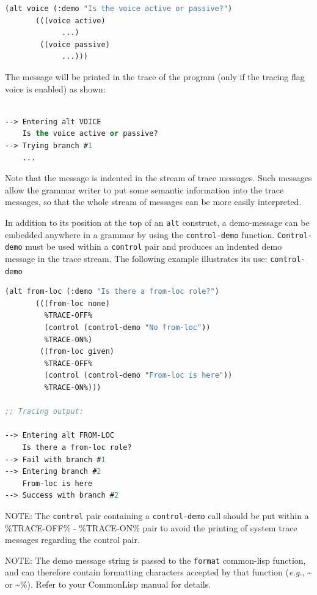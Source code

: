 \documentclass[10pt,a4paper]{report}
\begin{document}
\begin{lstlisting}[language=Lisp]
      (alt voice (:demo "Is the voice active or passive?")
	   (((voice active)
             ...)
	    ((voice passive)
             ...)))
\end{lstlisting}

The message will be printed in the trace of the program (only if the
tracing flag voice is enabled) as shown:

\begin{lstlisting}[language=Lisp]

--> Entering alt VOICE
    Is the voice active or passive?
--> Trying branch #1 
    ...
\end{lstlisting}

Note that the message is indented in the stream of trace messages.  Such
messages allow the grammar writer to put some semantic information into the
trace messages, so that the whole stream of messages can be more easily
interpreted.  

In addition to its position at the top of an {\tt alt} construct, a
demo-message can be embedded anywhere in a grammar by using the
{\tt control-demo} function.  {\tt Control-demo} must be used within a
{\tt control} pair and produces an indented demo message in the trace stream.
The following example illustrates its use:
{\tt control-demo} 

\begin{lstlisting}[language=Lisp]
      (alt from-loc (:demo "Is there a from-loc role?")
	   (((from-loc none)
	     %TRACE-OFF%
	     (control (control-demo "No from-loc"))
	     %TRACE-ON%)
	    ((from-loc given)
	     %TRACE-OFF%
	     (control (control-demo "From-loc is here"))
	     %TRACE-ON%)))

;; Tracing output:

--> Entering alt FROM-LOC
    Is there a from-loc role?
--> Fail with branch #1
--> Entering branch #2
    From-loc is here
--> Success with branch #2

\end{lstlisting}

NOTE: The {\tt control} pair containing a {\tt control-demo} call should be put
within a \%TRACE-OFF\% - \%TRACE-ON\% pair to avoid the printing of system
trace messages regarding the control pair.

NOTE: The demo message string is passed to the {\tt format} common-lisp
function, and can therefore contain formatting characters accepted by that
function ({\em e.g.}, \~{} or \~{}\%).  Refer to your CommonLisp manual for details.
\end{document}
